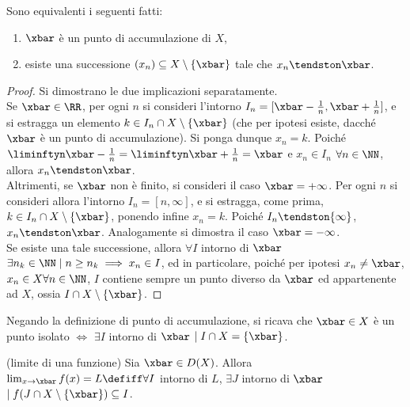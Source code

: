 \documentclass[11pt]{article}
\begin{document}
	\begin{proposition}
		Sono equivalenti i seguenti fatti:
		
		\begin{enumerate}
			\item $\xbar$ è un punto di accumulazione di $X$,
			\item esiste una successione $(x_n) \subseteq X \setminus \{\xbar\}$ tale
			che $x_n \tendston \xbar$.
		\end{enumerate}
	\end{proposition}
	
	\begin{proof} Si dimostrano le due implicazioni separatamente. \\
		
		\rightproof Se $\xbar \in \RR$, per ogni $n$ si consideri l'intorno $I_n = [\xbar - \frac{1}{n}, \xbar + \frac{1}{n}]$, e si estragga un elemento $k \in I_n \cap X \setminus \{\xbar\}$ (che per ipotesi esiste, dacché
		$\xbar$ è un punto di accumulazione). Si ponga dunque $x_n = k$. Poiché $\liminftyn \xbar - \frac{1}{n} = \liminftyn \xbar + \frac{1}{n} = \xbar$ e $x_n \in I_n$ $\forall n \in \NN$, allora $x_n \tendston \xbar$. \\
		
		Altrimenti, se $\xbar$ non è finito, si consideri il caso $\xbar = +\infty$. Per ogni $n$ si consideri allora l'intorno $I_n = [n, \infty]$, e si
		estragga, come prima, $k \in I_n \cap X \setminus \{\xbar\}$, ponendo infine $x_n = k$. Poiché $I_n \tendston \{\infty\}$, $x_n \tendston \xbar$. Analogamente si dimostra il caso $\xbar = -\infty$. \\
		
		\leftproof Se esiste una tale successione, allora $\forall I$ intorno di $\xbar$ $\exists n_k \in \NN \mid n \geq n_k \implies x_n \in I$, ed in particolare, poiché per ipotesi
		$x_n \neq \xbar$, $x_n \in X \forall n \in \NN$, $I$ contiene sempre un punto diverso
		da $\xbar$ ed appartenente ad $X$, ossia $I \cap X \setminus \{\xbar\}$.
	\end{proof}
	
	\begin{remark} Negando la definizione di punto di accumulazione, si ricava che $\xbar \in X$ è un
		punto isolato $\iff$ $\exists I$ intorno di $\xbar$ $\mid I \cap X = \{\xbar\}$.
	\end{remark}
	
	\begin{definition} (limite di una funzione) Sia $\xbar \in D(X)$. Allora $\lim_{x \to \xbar} f(x) = L 
		\defiff \forall I$ intorno di $L$, $\exists J$ intorno di $\xbar$ $\mid f(J \cap X \setminus \{\xbar\}) 
		\subseteq I$.
	\end{definition}
	
\end{document}
